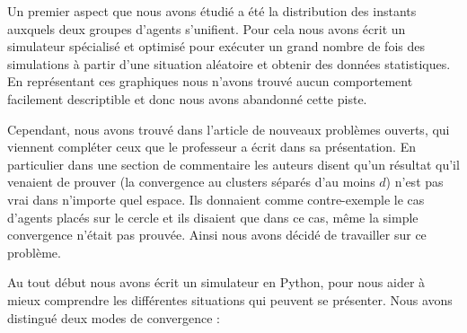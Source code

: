 \documentclass[a4paper,10pt]{article}
\begin{document}
Un premier aspect que nous avons étudié a été la distribution des instants auxquels deux groupes d'agents s'unifient. Pour cela nous avons écrit un simulateur spécialisé et optimisé pour exécuter un grand nombre de fois des simulations à partir d'une situation aléatoire et obtenir des données statistiques. En représentant ces graphiques nous n'avons trouvé aucun comportement facilement descriptible et donc nous avons abandonné cette piste.

Cependant, nous avons trouvé dans l'article de nouveaux problèmes ouverts, qui viennent compléter ceux que le professeur a écrit dans sa présentation. En particulier dans une section de commentaire les auteurs disent qu'un résultat qu'il venaient de prouver (la convergence au clusters séparés d'au moins $d$) n'est pas vrai dans n'importe quel espace. Ils donnaient comme contre-exemple le cas d'agents placés sur le cercle et ils disaient que dans ce cas, même la simple convergence n’était pas prouvée. Ainsi nous avons décidé de travailler sur ce problème.

Au tout début nous avons écrit un simulateur en Python, pour nous aider à mieux comprendre les différentes situations qui peuvent se présenter. Nous avons distingué deux modes de convergence : 
\end{document}
